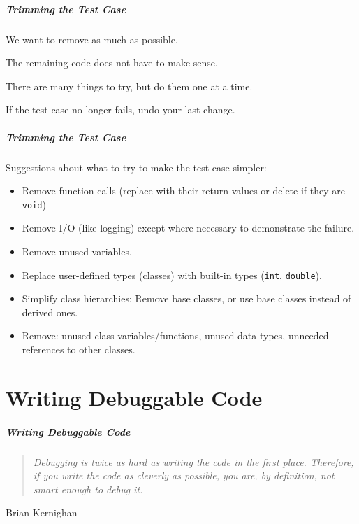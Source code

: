 \begin{frame}
\frametitle{Trimming the Test Case}
\begin{changemargin}{1cm}

We want to remove as much as possible.

The remaining code does not have to make sense.

There are many things to try, but do them one at a time.

If the test case no longer fails, undo your last change.

\end{changemargin}
\end{frame}


\begin{frame}
\frametitle{Trimming the Test Case}
\begin{changemargin}{1cm}

Suggestions about what to try to make the test case simpler:

\begin{itemize}
	\item Remove function calls (replace with their return values or delete if they are \texttt{void})
	\item Remove I/O (like logging) except where necessary to demonstrate the failure.
	\item Remove unused variables.
	\item Replace user-defined types (classes) with built-in types (\texttt{int}, \texttt{double}).
	\item Simplify class hierarchies: Remove base classes, or use base classes instead of derived ones.
	\item Remove: unused class variables/functions, unused data types, unneeded references to other classes.
\end{itemize}

\end{changemargin}
\end{frame}

\part{Writing Debuggable Code}
\frame{\partpage}

\begin{frame}
\frametitle{Writing Debuggable Code}
\begin{changemargin}{1cm}


\begin{quote}
	\emph{Debugging is twice as hard as writing the code in the first place. Therefore, if you write the code as cleverly as possible, you are, by definition, not smart enough to debug it.} 
\end{quote}
\hfill Brian Kernighan

\end{changemargin}
\end{frame}

